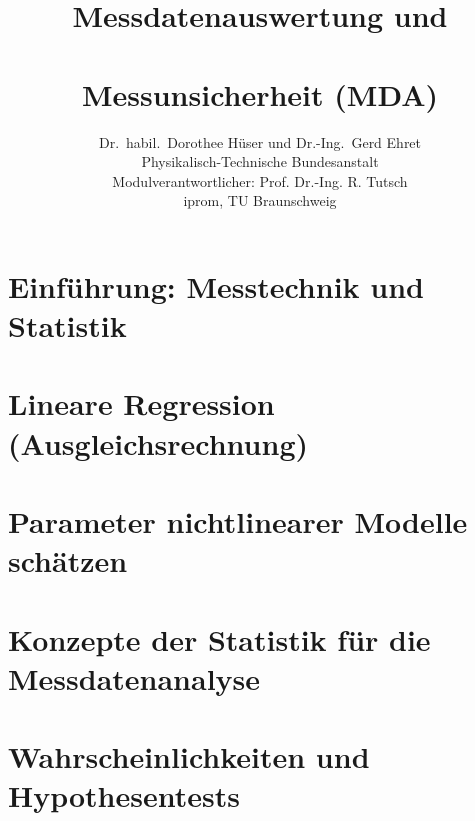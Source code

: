 \documentclass[a4paper,11pt]{book}
\title{\normalfont\sffamily\bfseries{\Huge{Messdatenauswertung und\\~\\ Messunsicherheit (MDA)}}}
\author{Dr.\ habil.\ Dorothee Hüser und Dr.-Ing.\ Gerd Ehret\\
Physikalisch-Technische Bundesanstalt\\
Modulverantwortlicher: Prof. Dr.-Ing. R. Tutsch\\
iprom, TU Braunschweig}
\begin{document}
\frontmatter                            %
\maketitle                              %
\tableofcontents                        %
\mainmatter                             %

\chapter{Einführung: Messtechnik und Statistik}
\label{Einfuehrung}

%
\chapter{Lineare Regression (Ausgleichsrechnung)}
\label{KapitellinReg}

%
\chapter{Parameter nichtlinearer Modelle schätzen}
\label{nonlinOpti}


\chapter{Konzepte der Statistik für die Messdatenanalyse}
\label{konzepteStatistik}

%
\chapter{Wahrscheinlichkeiten und Hypothesentests}
\label{wahrscheinlichHyp}

\end{document}
